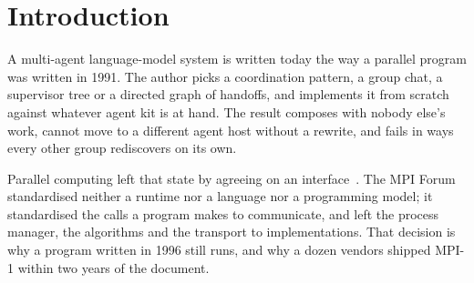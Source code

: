 \documentclass[sigconf,nonacm]{acmart}
\newcommand{\ampi}{\textsc{AgentMPI}\xspace}
\begin{document}
\begin{abstract}
\ampi ships as a specification, a reference runtime over a six-operation device
interface with five transports, a conformance suite of \nProtocolTests\ protocol
and \nDeviceTests\ device assertions run unchanged against every transport, and a
process manager. Real agent populations exercised it: paired eight-rank
translation runs, a hundred-rank run under executor oversubscription, and a
production translation of a Russian biography into three languages by 16, 32 and
64 process ranks on one machine and by 128 and 256 ranks over four, every scale
carried to a finished book. Six earlier multi-machine attempts did not finish,
each measuring a different limit of a transport that shares nothing but a git
ref; we report them as such, alongside three negative results. A second harness
over the same runtime replaces the phase structure with a work pool and removes
two thirds of the population's idleness at $p=16$, which locates that idleness
in the harness rather than in the models or the protocol.
\end{abstract}


\maketitle

\section{Introduction}

A multi-agent language-model system is written today the way a parallel program
was written in 1991. The author picks a coordination pattern, a group chat, a
supervisor tree or a directed graph of handoffs, and implements it from scratch
against whatever agent kit is at hand. The result composes with nobody else's
work, cannot move to a different agent host without a rewrite, and fails in ways
every other group rediscovers on its own.

Parallel computing left that state by agreeing on an
interface~\cite{walker1992standards,mpiforum1994mpi10}. The MPI Forum
standardised neither a runtime nor a language nor a programming model; it
standardised the calls a program makes to communicate, and left the process
manager, the algorithms and the transport to implementations. That decision is
why a program written in 1996 still runs, and why a dozen vendors shipped MPI-1
within two years of the document.
\end{document}
